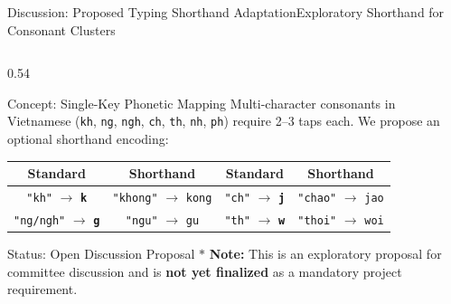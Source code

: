 \documentclass[aspectratio=169,10pt]{beamer}
\begin{document}
\begin{frame}{Discussion: Proposed Typing Shorthand Adaptation}{Exploratory Shorthand for Consonant Clusters}
  \begin{columns}[T]
    \begin{column}{0.54\textwidth}
      \begin{block}{Concept: Single-Key Phonetic Mapping}
        {\scriptsize Multi-character consonants in Vietnamese (\texttt{kh}, \texttt{ng}, \texttt{ngh}, \texttt{ch}, \texttt{th}, \texttt{nh}, \texttt{ph}) require 2--3 taps each. We propose an optional shorthand encoding:}
        \vspace{0.08cm}
        \begin{center}
          \scriptsize\renewcommand{\arraystretch}{1.1}
          \begin{tabular}{c c c c}
            \toprule
            \textbf{Standard} & \textbf{Shorthand} & \textbf{Standard} & \textbf{Shorthand} \\
            \midrule
            \texttt{"kh"} $\to$ \textbf{\texttt{k}} & \texttt{"khong"} $\to$ \texttt{kong} &
            \texttt{"ch"} $\to$ \textbf{\texttt{j}} & \texttt{"chao"} $\to$ \texttt{jao} \\
            \texttt{"ng/ngh"} $\to$ \textbf{\texttt{g}} & \texttt{"ngu"} $\to$ \texttt{gu} &
            \texttt{"th"} $\to$ \textbf{\texttt{w}} & \texttt{"thoi"} $\to$ \texttt{woi} \\
            \bottomrule
          \end{tabular}
        \end{center}
      \end{block}
      \vspace{0.05cm}
      \begin{alertblock}{Status: Open Discussion Proposal}
        {\tiny $\ast$ \textbf{Note:} This is an exploratory proposal for committee discussion and is \textbf{not yet finalized} as a mandatory project requirement.}
      \end{alertblock}
    \end{column}


\end{columns}
\end{frame}
\end{document}
